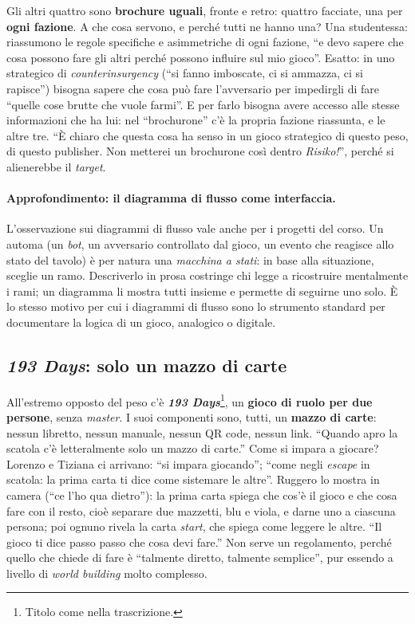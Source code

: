 Gli altri quattro sono \textbf{brochure uguali}, fronte e retro: quattro facciate, una per
\textbf{ogni fazione}. A che cosa servono, e perché tutti ne hanno una? Una studentessa:
riassumono le regole specifiche e asimmetriche di ogni fazione, ``e devo sapere che cosa
possono fare gli altri perché possono influire sul mio gioco''. Esatto: in uno
strategico di \emph{counterinsurgency} (``si fanno imboscate, ci si ammazza, ci si
rapisce'') bisogna sapere che cosa può fare l'avversario per impedirgli di fare ``quelle
cose brutte che vuole farmi''. E per farlo bisogna avere accesso alle stesse
informazioni che ha lui: nel ``brochurone'' c'è la propria fazione riassunta, e le altre
tre. ``È chiaro che questa cosa ha senso in un gioco strategico di questo peso, di questo
publisher. Non metterei un brochurone così dentro \emph{Risiko!}'', perché si
alienerebbe il \emph{target}.

\paragraph{Approfondimento: il diagramma di flusso come interfaccia.} L'osservazione
sui diagrammi di flusso vale anche per i progetti del corso. Un automa (un \emph{bot}, un
avversario controllato dal gioco, un evento che reagisce allo stato del tavolo) è per
natura una \emph{macchina a stati}: in base alla situazione, sceglie un ramo. Descriverlo
in prosa costringe chi legge a ricostruire mentalmente i rami; un diagramma li mostra
tutti insieme e permette di seguirne uno solo. È lo stesso motivo per cui i diagrammi
di flusso sono lo strumento standard per documentare la logica di un gioco, analogico o
digitale.

\subsection{\emph{193 Days}: solo un mazzo di carte}



All'estremo opposto del peso c'è \textbf{\emph{193 Days}}\footnote{Titolo come nella
trascrizione.}, un \textbf{gioco di ruolo per due persone}, senza \emph{master}. I suoi
componenti sono, tutti, un \textbf{mazzo di carte}: nessun libretto, nessun manuale,
nessun QR code, nessun link. ``Quando apro la scatola c'è letteralmente solo un mazzo di
carte.'' Come si impara a giocare? Lorenzo e Tiziana ci arrivano: ``si impara giocando'';
``come negli \emph{escape} in scatola: la prima carta ti dice come sistemare le altre''.
Ruggero lo mostra in camera (``ce l'ho qua dietro''): la prima carta spiega che cos'è il
gioco e che cosa fare con il resto, cioè separare due mazzetti, blu e viola, e darne uno
a ciascuna persona; poi ognuno rivela la carta \emph{start}, che spiega come leggere le
altre. ``Il gioco ti dice passo passo che cosa devi fare.'' Non serve un regolamento,
perché quello che chiede di fare è ``talmente diretto, talmente semplice'', pur essendo
a livello di \emph{world building} molto complesso.


